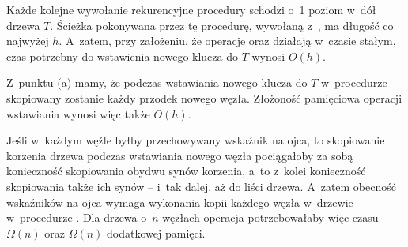 \subproblem %
Każde kolejne wywołanie rekurencyjne procedury  schodzi o~1 poziom w~dół drzewa $T$.
Ścieżka pokonywana przez tę procedurę, wywołaną z~, ma długość co najwyżej $h$.
A~zatem, przy założeniu, że operacje  oraz  działają w~czasie stałym, czas potrzebny do wstawienia nowego klucza do $T$ wynosi $O(h)$.

Z~punktu (a) mamy, że podczas wstawiania nowego klucza do $T$ w~procedurze  skopiowany zostanie każdy przodek nowego węzła.
Złożoność pamięciowa operacji wstawiania wynosi więc także $O(h)$.

\subproblem %
Jeśli w~każdym węźle byłby przechowywany wskaźnik na ojca, to skopiowanie korzenia drzewa podczas wstawiania nowego węzła pociągałoby za sobą konieczność skopiowania obydwu synów korzenia, a~to z~kolei konieczność skopiowania także ich synów -- i~tak dalej, aż do liści drzewa.
A~zatem obecność wskaźników na ojca wymaga wykonania kopii każdego węzła w~drzewie w~procedurze .
Dla drzewa o~$n$ węzłach operacja  potrzebowałaby więc czasu $\Omega(n)$ oraz $\Omega(n)$ dodatkowej pamięci.

\subproblem %
